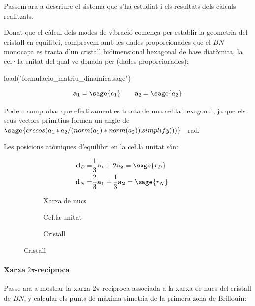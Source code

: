 \documentclass[12pt]{article} %
\let\vec\mathbf %
\begin{document}
Passem ara a descriure el sistema que s'ha estudiat i els resultats dels càlculs realitzats.

Donat que el càlcul dels modes de vibració comença per establir la geometria del cristall en equilibri, comprovem amb les dades proporcionades que el $BN$ monocapa es tracta d'un cristall bidimensional hexagonal de base diatòmica, la cel·la unitat del qual ve donada per (dades proporcionades):

\begin{sagesilent}
load("formulacio_matriu_dinamica.sage")
\end{sagesilent}

\begin{equation}
\vec a_1=\sage{a_1}\qquad\vec a_2=\sage{a_2} 
\end{equation}

Podem comprobar que efectivament es tracta de una ce\l.la hexagonal, ja que els seus vectors primitius formen un angle de $\sage{arccos(a_1*a_2/(norm(a_1)*norm(a_2)).simplify())}$ \SI{}{\radian}.

Les posicions atòmiques d'equilibri en la ce\l.la unitat són:

\begin{equation}\begin{split}
\vec d_B=&\frac{1}{3}\vec{a_1}+2\vec{a_2}=\sage{r_B}\qquad\\
\vec d_N=&\frac{2}{3}\vec{a_1}+\frac{1}{3}\vec{a_2}=\sage{r_N} 
\end{split}\end{equation} 



\begin{figure}[h]
\centering
\begin{subfigure}[b]{0.3\textwidth}
\centering
{}
\caption{Xarxa de nucs}
\end{subfigure}
\begin{subfigure}[b]{0.3\textwidth}
\centering
{}
\caption{Ce\l.la unitat}
\end{subfigure}
\begin{subfigure}[b]{0.3\textwidth}
\centering
{}
\caption{Cristall}
\end{subfigure}
\end{figure}


\paragraph{Xarxa $2\pi$-recíproca}
Passe ara a mostrar la xarxa $2\pi$-recíproca associada a la xarxa de nucs del cristall de $BN$, y calcular els punts de màxima simetria de la primera zona de Brillouin:
\end{document}
